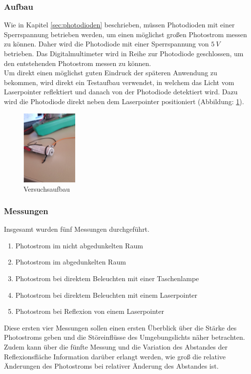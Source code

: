 \subsubsection{Aufbau}
Wie in Kapitel \ref{sec:photodioden} beschrieben, müssen Photodioden mit einer Sperrspannung betrieben werden, um einen möglichst großen Photostrom messen zu können. Daher wird die Photodiode mit einer Sperrspannung von $5\:V$ betrieben. Das Digitalmultimeter wird in Reihe zur Photodiode geschlossen, um den entstehenden Photostrom messen zu können.\\
Um direkt einen möglichst guten Eindruck der späteren Anwendung zu bekommen, wird direkt ein Testaufbau verwendet, in welchem das Licht vom Laserpointer reflektiert und danach von der Photodiode detektiert wird. Dazu wird die Photodiode direkt neben dem Laserpointer positioniert (Abbildung: \ref{versuch1_versuchsaufbau}). 
\begin{figure}[H]
	\centering
	\includegraphics[width=0.25\textwidth]{images/Machbarkeitsstudie/Versuch1_Aufbau}	
	\caption{Versuchsaufbau}
	\label{versuch1_versuchsaufbau}
\end{figure}
\newpage
\subsubsection{Messungen}
Insgesamt wurden fünf Messungen durchgeführt.
\begin{enumerate}
	\item Photostrom im nicht abgedunkelten Raum
	\item Photostrom im abgedunkelten Raum
	\item Photostrom bei direktem Beleuchten mit einer Taschenlampe
	\item Photostrom bei direktem Beleuchten mit einem Laserpointer
	\item Photostrom bei Reflexion von einem Laserpointer
\end{enumerate}
Diese ersten vier Messungen sollen einen ersten Überblick über die Stärke des Photostroms geben und die Störeinflüsse des Umgebungslichts näher betrachten. Zudem kann über die fünfte Messung und die Variation des Abstandes der Reflexionsfläche Information darüber erlangt werden, wie groß die relative Änderungen des Photostroms bei relativer Änderung des Abstandes ist.
